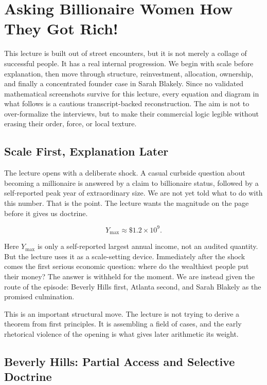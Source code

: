 \chapter{Asking Billionaire Women How They Got Rich!}

This lecture is built out of street encounters, but it is not merely a collage of successful people. It has a real internal progression. We begin with scale before explanation, then move through structure, reinvestment, allocation, ownership, and finally a concentrated founder case in Sarah Blakely. Since no validated mathematical screenshots survive for this lecture, every equation and diagram in what follows is a cautious transcript-backed reconstruction. The aim is not to over-formalize the interviews, but to make their commercial logic legible without erasing their order, force, or local texture.

\section{Scale First, Explanation Later}

The lecture opens with a deliberate shock. A casual curbside question about becoming a millionaire is answered by a claim to billionaire status, followed by a self-reported peak year of extraordinary size. We are not yet told what to do with this number. That is the point. The lecture wants the magnitude on the page before it gives us doctrine.

\begin{equation}
Y_{\max} \approx \$1.2 \times 10^{9}.
\end{equation}

Here \(Y_{\max}\) is only a self-reported largest annual income, not an audited quantity. But the lecture uses it as a scale-setting device. Immediately after the shock comes the first serious economic question: where do the wealthiest people put their money? The answer is withheld for the moment. We are instead given the route of the episode: Beverly Hills first, Atlanta second, and Sarah Blakely as the promised culmination.

This is an important structural move. The lecture is not trying to derive a theorem from first principles. It is assembling a field of cases, and the early rhetorical violence of the opening is what gives later arithmetic its weight.

\section{Beverly Hills: Partial Access and Selective Doctrine}

